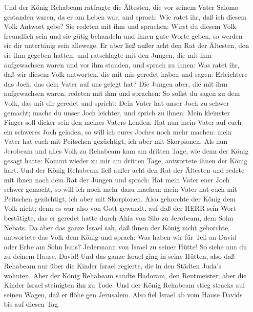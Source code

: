  Und der König Rehabeam ratfragte die Ältesten, die vor
seinem Vater Salomo gestanden waren, da er am Leben war, und sprach: Wie
ratet ihr, daß ich diesem Volk Antwort gebe?  Sie redeten
mit ihm und sprachen: Wirst du diesem Volk freundlich sein und sie gütig
behandeln und ihnen gute Worte geben, so werden sie dir untertänig sein
allewege.  Er aber ließ außer acht den Rat der Ältesten, den
sie ihm gegeben hatten, und ratschlagte mit den Jungen, die mit ihm
aufgewachsen waren und vor ihm standen,  und sprach zu
ihnen: Was ratet ihr, daß wir diesem Volk antworten, die mit mir geredet
haben und sagen: Erleichtere das Joch, das dein Vater auf uns gelegt
hat?  Die Jungen aber, die mit ihm aufgewachsen waren,
redeten mit ihm und sprachen: So sollst du sagen zu dem Volk, das mit
dir geredet und spricht: Dein Vater hat unser Joch zu schwer gemacht;
mache du unser Joch leichter, und sprich zu ihnen: Mein kleinster Finger
soll dicker sein den meines Vaters Lenden.  Hat nun mein
Vater auf euch ein schweres Joch geladen, so will ich eures Joches noch
mehr machen: mein Vater hat euch mit Peitschen gezüchtigt, ich aber mit
Skorpionen.  Als nun Jerobeam und alles Volk zu Rehabeam
kam am dritten Tage, wie denn der König gesagt hatte: Kommt wieder zu
mir am dritten Tage,  antwortete ihnen der König hart. Und
der König Rehabeam ließ außer acht den Rat der Ältesten 
und redete mit ihnen nach dem Rat der Jungen und sprach: Hat mein Vater
euer Joch schwer gemacht, so will ich noch mehr dazu machen: mein Vater
hat euch mit Peitschen gezüchtigt, ich aber mit Skorpionen.
 Also gehorchte der König dem Volk nicht; denn es war also
von Gott gewandt, auf daß der HERR sein Wort bestätigte, das er geredet
hatte durch Ahia von Silo zu Jerobeam, dem Sohn Nebats.  Da
aber das ganze Israel sah, daß ihnen der König nicht gehorchte,
antwortete das Volk dem König und sprach: Was haben wir für Teil an
David oder Erbe am Sohn Isais? Jedermann von Israel zu seiner Hütte! So
siehe nun du zu deinem Hause, David! Und das ganze Israel ging in seine
Hütten,  also daß Rehabeam nur über die Kinder Israel
regierte, die in den Städten Juda's wohnten.  Aber der
König Rehabeam sandte Hadoram, den Rentmeister; aber die Kinder Israel
steinigten ihn zu Tode. Und der König Rehabeam stieg stracks auf seinen
Wagen, daß er flöhe gen Jerusalem.  Also fiel Israel ab vom
Hause Davids bis auf diesen Tag.

